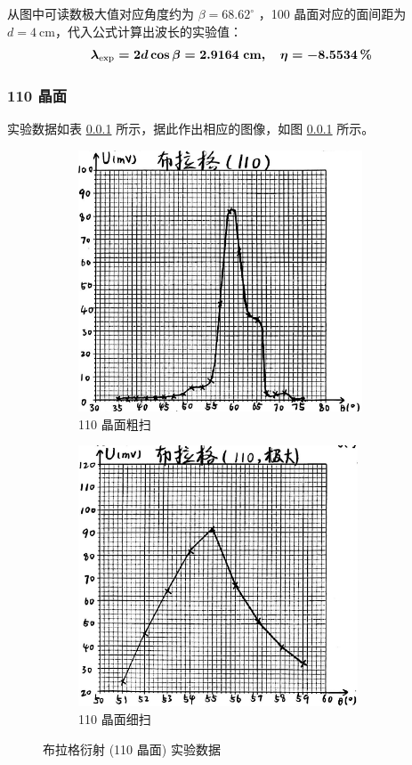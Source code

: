 \documentclass[UTF8]{article}
\theoremstyle{MyLineTheoremStyle} %
\theoremstyle{MyBlockTheoremStyle} %
\theoremstyle{MySubsubsectionStyle} %
\begin{document}
从图中可读数极大值对应角度约为 $\beta = 68.62^\circ$ ，100 晶面对应的面间距为 $d = 4 \ \mathrm{cm}$，代入公式计算出波长的实验值：
\begin{equation}\boldmath
    \lambda_\text{exp} = 2d \cos \beta = 2.9164 \ \mathrm{cm},\quad 
    \eta = -8.5534 \,\%
\end{equation}

\subsubsection{110 晶面}
实验数据如表 \ref{} 所示，据此作出相应的图像，如图 \ref{} 所示。
\begin{figure}[H]\centering
\begin{subfigure}[b]{0.5\columnwidth}\centering
    \includegraphics[height=220pt]{assets/4 布拉格/布 110.png}
    \caption{110 晶面粗扫}
\end{subfigure}\hfill
\begin{subfigure}[b]{0.5\columnwidth}\centering
    \includegraphics[height=220pt]{assets/4 布拉格/布 110大.png}
    \caption{110 晶面细扫}
\end{subfigure}
\caption{布拉格衍射 (110 晶面) 实验数据}
\label{110}
\end{figure}
\end{document}
